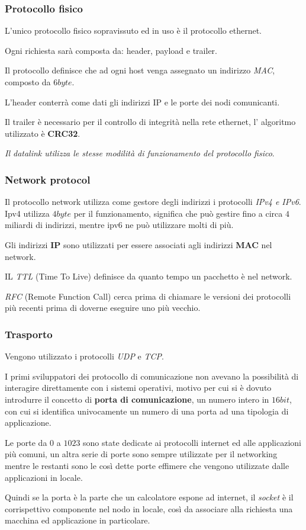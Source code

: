 \subsubsection{Protocollo fisico}
L'unico protocollo fisico sopravissuto ed in uso è il protocollo ethernet.

Ogni richiesta sarà composta da: header, payload e trailer.

Il protocollo definisce che ad ogni host venga assegnato un indirizzo
\emph{MAC}, composto da $6byte$.

L'header conterrà come dati gli indirizzi IP e le porte dei nodi comunicanti.

Il trailer è necessario per il controllo di integrità nella rete ethernet, l'
algoritmo utilizzato è \textbf{CRC32}.

\emph{Il datalink utilizza le stesse modilità di funzionamento del protocollo
fisico}.

\subsubsection{Network protocol}
Il protocollo network utilizza come gestore degli indirizzi i protocolli
\emph{IPv4 e IPv6}.
Ipv4 utilizza $4byte$ per il funzionamento, significa che può gestire fino a 
circa $4$ miliardi di indirizzi, mentre ipv6 ne può utilizzare molti di più.

Gli indirizzi \textbf{IP} sono utilizzati per essere associati agli indirizzi
\textbf{MAC} nel network.

IL \emph{TTL} (Time To Live) definisce da quanto tempo un pacchetto è nel
network.

\emph{RFC} (Remote Function Call) cerca prima di chiamare le versioni dei
protocolli più recenti prima di doverne eseguire uno più vecchio.

\subsubsection{Trasporto}
Vengono utilizzato i protocolli \emph{UDP} e \emph{TCP}.

I primi sviluppatori dei protocollo di comunicazione non avevano la possibilità
di interagire direttamente con i sistemi operativi, motivo per cui si è dovuto
introdurre il concetto di \textbf{porta di comunicazione}, un numero intero
in $16bit$, con cui si identifica univocamente un numero di una porta ad una
tipologia di applicazione.

Le porte da $0$ a $1023$ sono state dedicate ai protocolli internet ed alle
applicazioni più comuni, un altra serie di porte sono sempre utilizzate per
il networking  mentre le restanti sono le così dette porte effimere che vengono
utilizzate dalle applicazioni in locale.

Quindi se la porta è la parte che un calcolatore espone ad internet, il
\emph{socket} è il corrispettivo componente nel nodo in locale, così da
associare alla richiesta una macchina ed applicazione in particolare.
